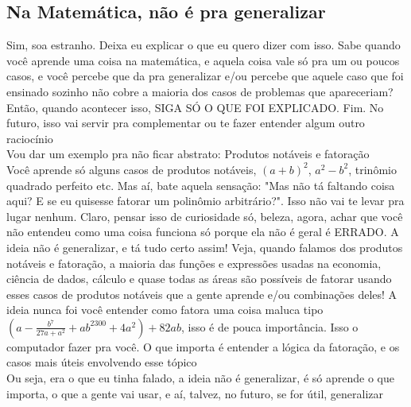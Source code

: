 \documentclass{article}
\begin{document}
\subsection{Na Matemática, não é pra generalizar}
Sim, soa estranho. Deixa eu explicar o que eu quero dizer com isso. Sabe quando você aprende uma coisa na matemática, e aquela coisa vale só pra um ou poucos casos, e você percebe que da pra generalizar e/ou percebe que aquele caso que foi ensinado sozinho não cobre a maioria dos casos de problemas que apareceriam? Então, quando acontecer isso, SIGA SÓ O QUE FOI EXPLICADO. Fim. No futuro, isso vai servir pra complementar ou te fazer entender algum outro raciocínio
\\[5pt]
Vou dar um exemplo pra não ficar abstrato: Produtos notáveis e fatoração
\\[5pt]
Você aprende só alguns casos de produtos notáveis, $(a+b)^2$, $a^2-b^2$, trinômio quadrado perfeito etc. Mas aí, bate aquela sensação: "Mas não tá faltando coisa aqui? E se eu quisesse fatorar um polinômio arbitrário?". Isso não vai te levar pra lugar nenhum. Claro, pensar isso de curiosidade só, beleza, agora, achar que você não entendeu como uma coisa funciona só porque ela não é geral é ERRADO. A ideia não é generalizar, e tá tudo certo assim! Veja, quando falamos dos produtos notáveis e fatoração, a maioria das funções e expressões usadas na economia, ciência de dados, cálculo e quase todas as áreas são possíveis de fatorar usando esses casos de produtos notáveis que a gente aprende e/ou combinações deles! A ideia nunca foi você entender como fatora uma coisa maluca tipo $(a - \frac{b^7}{27a+a^2}+ab^{2300}+4a^2) +82ab$, isso é de pouca importância. Isso o computador fazer pra você. O que importa é entender a lógica da fatoração, e os casos mais úteis envolvendo esse tópico
\\[5pt]
Ou seja, era o que eu tinha falado, a ideia não é generalizar, é só aprende o que importa, o que a gente vai usar, e aí, talvez, no futuro, se for útil, generalizar
\end{document}
